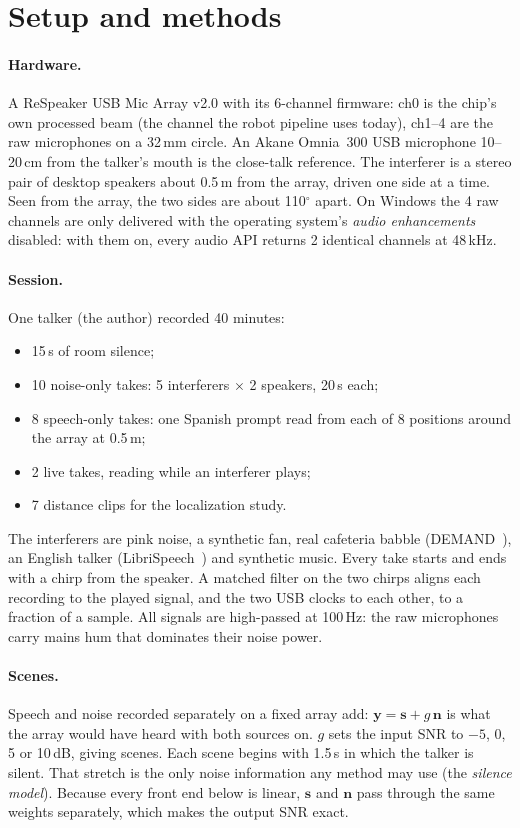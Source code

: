 \section{Setup and methods}
\label{sec:methods}

\paragraph{Hardware.} A ReSpeaker USB Mic Array v2.0 with its 6-channel
firmware: ch0 is the chip's own processed beam (the channel the robot
pipeline uses today), ch1--4 are the raw microphones on a 32\,mm circle.
An Akane Omnia~300 USB microphone 10--20\,cm from the talker's mouth is the
close-talk reference. The interferer is a stereo pair of desktop speakers
about 0.5\,m from the array, driven one side at a time. Seen from the array,
the two sides are about 110$^\circ$ apart. On Windows the 4 raw channels are
only delivered with the operating system's \emph{audio enhancements}
disabled: with them on, every audio API returns 2 identical channels at
48\,kHz.

\paragraph{Session.} One talker (the author) recorded 40 minutes:
\begin{itemize}
\item 15\,s of room silence;
\item 10 noise-only takes: 5 interferers $\times$ 2 speakers, 20\,s each;
\item 8 speech-only takes: one Spanish prompt read from each of 8 positions
  around the array at 0.5\,m;
\item 2 live takes, reading while an interferer plays;
\item 7 distance clips for the localization study.
\end{itemize}
The interferers are pink noise, a synthetic fan, real cafeteria babble
(DEMAND~\cite{thiemann2013demand}), an English talker
(LibriSpeech~\cite{panayotov2015librispeech}) and synthetic music. Every
take starts and ends with a chirp from the speaker. A matched filter on the
two chirps aligns each recording to the played signal, and the two USB
clocks to each other, to a fraction of a sample. All signals are
high-passed at 100\,Hz: the raw microphones carry mains hum that
dominates their noise power.

\paragraph{Scenes.} Speech and noise recorded separately on a fixed array
add: $\mathbf{y}=\mathbf{s}+g\,\mathbf{n}$ is what the array would have
heard with both sources on. $g$ sets the input SNR to $-5$, 0, 5 or 10\,dB,
giving \NScenes{} scenes. Each scene begins with 1.5\,s in which the
talker is silent. That stretch is the only noise information any method may
use (the \emph{silence model}). Because every front end below is linear,
$\mathbf{s}$ and $\mathbf{n}$ pass through the same weights separately,
which makes the output SNR exact.

